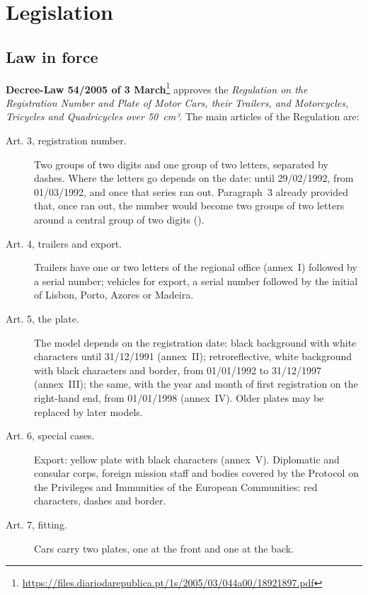 \section{Legislation}\label{sec:legislacao}

\subsection{Law in force}

\textbf{Decree-Law 54/2005 of 3 March}\footnote{\url{https://files.diariodarepublica.pt/1s/2005/03/044a00/18921897.pdf}}
approves the \emph{Regulation on the Registration Number and Plate of Motor Cars,
their Trailers, and Motorcycles, Tricycles and Quadricycles over 50~cm³}. The main
articles of the Regulation are:

\begin{description}
  \item[Art. 3, registration number.] Two groups of two digits and one group of
    two letters, separated by dashes. Where the letters go depends on the date:
     until 29/02/1992,  from 01/03/1992, and
     once that series ran out. Paragraph~3 already provided that,
    once  ran out, the number would become two groups of two
    letters around a central group of two digits ().
  \item[Art. 4, trailers and export.] Trailers have one or two letters of the
    regional office (annex~I) followed by a serial number; vehicles for export, a
    serial number followed by the initial of Lisbon, Porto, Azores or Madeira.
  \item[Art. 5, the plate.] The model depends on the registration date: black
    background with white characters until 31/12/1991 (annex~II); retroreflective,
    white background with black characters and border, from 01/01/1992 to
    31/12/1997 (annex~III); the same, with the year and month of first
    registration on the right-hand end, from 01/01/1998 (annex~IV). Older plates
    may be replaced by later models.
  \item[Art. 6, special cases.] Export: yellow plate with black characters
    (annex~V). Diplomatic and consular corps, foreign mission staff and bodies
    covered by the Protocol on the Privileges and Immunities of the European
    Communities: red characters, dashes and border.
  \item[Art. 7, fitting.] Cars carry two plates, one at the front and one at the
    back.
\end{description}

